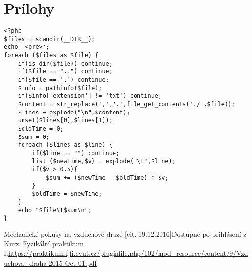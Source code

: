 \documentclass[a4paper,10pt]{article}
\begin{document}
\clearpage

\section{Prílohy}

\begin{lstlisting}
<?php
$files = scandir(__DIR__);
echo '<pre>';
foreach ($files as $file) {
    if(is_dir($file)) continue;
    if($file == "..") continue;
    if($file == '.') continue;
    $info = pathinfo($file);
    if($info['extension'] != 'txt') continue;
    $content = str_replace(',','.',file_get_contents('./'.$file));
    $lines = explode("\n",$content);
    unset($lines[0],$lines[1]);
    $oldTime = 0;
    $sum = 0;
    foreach ($lines as $line) {
        if($line == "") continue;
        list ($newTime,$v) = explode("\t",$line);
        if($v > 0.5){
            $sum += ($newTime - $oldTime) * $v;
        }
        $oldTime = $newTime;
    }
    echo "$file\t$sum\n";
}
\end{lstlisting}



\begin{thebibliography}{2}
Mechanické pokusy na vzduchové dráze [cit. 19.12.2016]Dostupné po prihlásení z Kurz: Fyzikální praktikum I:\url{https://praktikum.fjfi.cvut.cz/pluginfile.php/102/mod_resource/content/9/Vzduchova_draha-2015-Oct-01.pdf}

\end{thebibliography}
\end{document}
